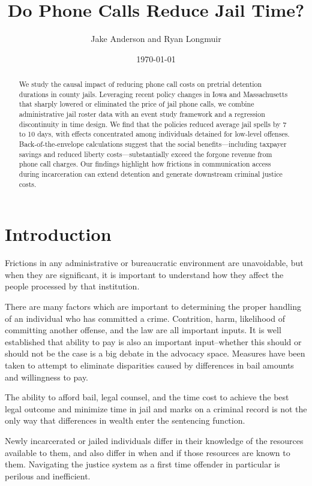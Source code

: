 \documentclass[12pt, a4paper]{article}
\title{Do Phone Calls Reduce Jail Time?}
\author{Jake Anderson and Ryan Longmuir}
\date{\today}
\begin{document}
\maketitle


\begin{abstract}
We study the causal impact of reducing phone call costs on pretrial detention durations in county jails. Leveraging recent policy changes in Iowa and Massachusetts that sharply lowered or eliminated the price of jail phone calls, we combine administrative jail roster data with an event study framework and a regression discontinuity in time design. We find that the policies reduced average jail spells by 7 to 10 days, with effects concentrated among individuals detained for low-level offenses. Back-of-the-envelope calculations suggest that the social benefits—including taxpayer savings and reduced liberty costs—substantially exceed the forgone revenue from phone call charges. Our findings highlight how frictions in communication access during incarceration can extend detention and generate downstream criminal justice costs.
\end{abstract}

\newpage
\section{Introduction}


Frictions in any administrative or bureaucratic environment are unavoidable, but when they are significant, it is important to understand how they affect the people processed by that institution. 

There are many factors which are important to determining the proper handling of an individual who has committed a crime. Contrition, harm, likelihood of committing another offense, and the law are all important inputs. It is well established that ability to pay is also an important input--whether this should or should not be the case is a big debate in the advocacy space. Measures have been taken to attempt to eliminate disparities caused by differences in bail amounts and willingness to pay. 

The ability to afford bail, legal counsel, and the time cost to achieve the best legal outcome and minimize time in jail and marks on a criminal record is not the only way that differences in wealth enter the sentencing function. 

Newly incarcerated or jailed individuals differ in their knowledge of the resources available to them, and also differ in when and if those resources are known to them. Navigating the justice system as a first time offender in particular is perilous and inefficient. 
\end{document}

